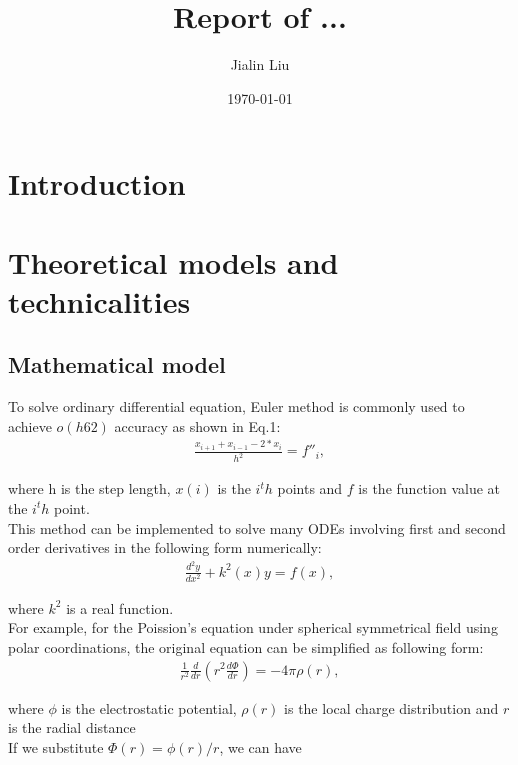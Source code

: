 \documentclass{article}
\begin{document}
\lstset{language=Pascal}          %
\title{Report of ...}
\author{Jialin Liu}
\date{\today}
\maketitle

\newpage

\section{Introduction}
\section{Theoretical models and technicalities}
\subsection{Mathematical model}	
To solve ordinary differential equation, Euler method is commonly used to achieve $o(h62)$ accuracy as shown in Eq.1:\\

\begin{align}
\frac{x_{i+1}+x_{i-1}-2*x_i}{h^2} = f{''}_i,
\end{align}

where h is the step length, $x(i)$ is the $i^th$ points and $f$ is the function value at the $i^th$ point. \\
This method can be implemented to solve many ODEs involving first and second order derivatives in the following form numerically:\\

\begin{align}
\frac{d^2y}{dx^2}+k^2(x)y = f(x),
\end{align}

where $k^2$ is a real function.\\
For example, for the Poission's equation under spherical symmetrical field using polar coordinations, the original equation can be simplified as following form:\\

\begin{align}
\frac{1}{r^2}\frac{d}{dr}\left(r^2\frac{d\Phi}{dr}\right) = -4\pi \rho(r),
\end{align}

where $\phi$ is the electrostatic potential, $\rho(r)$ is the local charge distribution and $r$ is the radial distance\\
If we substitute $\Phi(r)= \phi(r)/r$, we can have \\
\end{document}

